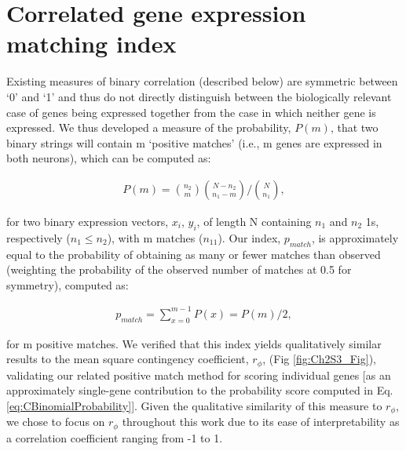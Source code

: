 \section{Correlated gene expression matching index}
\label{app:AppendixCh2_3}

Existing measures of binary correlation (described below) are symmetric between ‘0’ and ‘1’ and thus do not directly distinguish between the biologically relevant case of genes being expressed together from the case in which neither gene is expressed. We thus developed a measure of the probability, $P(m)$, that two binary strings will contain m ‘positive matches’ (i.e., m genes are expressed in both neurons), which can be computed as:


\begin{eqnarray}
	\label{eq:S3}
     P(m) = \binom{n_{2}}{m}\binom{N-n_{2}}{n_{1}-m}/\binom{N}{n_{1}},
\end{eqnarray}

for two binary expression vectors, $x_{i}$, $y_{i}$, of length N containing $n_{1}$ and $n_{2}$ 1s, respectively ($n_{1} \leq n_{2}$), with m matches ($n_{11}$). Our index, $p_{match}$, is approximately equal to the probability of obtaining as many or fewer matches than observed (weighting the probability of the observed number of matches at 0.5 for symmetry), computed as:

\begin{eqnarray}
	\label{eq:S4}
     p_{match} = \sum_{x=0}^{m-1}P(x)=P(m)/2,
\end{eqnarray}

for m positive matches.
	We verified that this index yields qualitatively similar results to the mean square contingency coefficient, $r_\phi$, (Fig \ref{fig:Ch2S3_Fig}), validating our related positive match method for scoring individual genes [as an approximately single-gene contribution to the probability score computed in Eq. \ref{eq:CBinomialProbability}].
Given the qualitative similarity of this measure to $r_\phi$, we chose to focus on $r_\phi$ throughout this work due to its ease of interpretability as a correlation coefficient ranging from -1 to 1.

